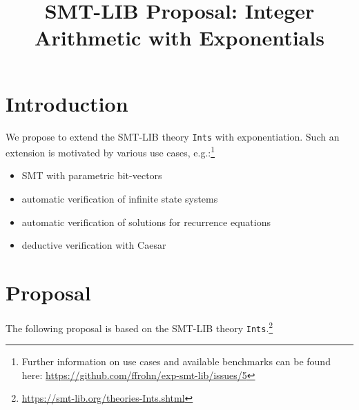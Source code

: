 \documentclass{article}
\title{SMT-LIB Proposal: Integer Arithmetic with Exponentials}
\begin{document}
\maketitle

\section{Introduction}

We propose to extend the SMT-LIB theory {\tt Ints} with exponentiation.
%
Such an extension is motivated by various use cases, e.g.:\footnote{Further information on use cases and available benchmarks can be found here: \url{https://github.com/ffrohn/exp-smt-lib/issues/5}}
%
\begin{itemize}
\item SMT with parametric bit-vectors \cite{bitvec}
\item automatic verification of infinite state systems \cite{swine}
\item automatic verification of solutions for recurrence equations \cite{swine2}
\item deductive verification with Caesar \cite{caesar}
\end{itemize}

\section{Proposal}

The following proposal is based on the SMT-LIB theory {\tt Ints}.\footnote{\url{https://smt-lib.org/theories-Ints.shtml}}
\end{document}
